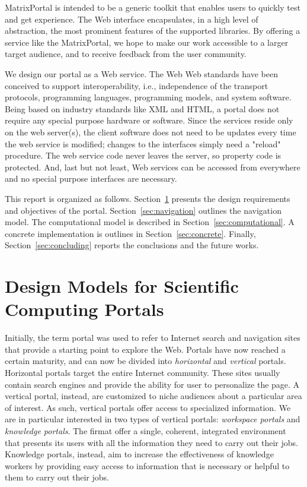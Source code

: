 \documentclass[11pt,relax]{SANDreport}
\begin{document}
MatrixPortal is intended to be a generic
toolkit that enables users to quickly test and get experience. The Web
interface encapsulates, in a high level of abstraction, the most prominent
features of the supported libraries. By offering a service like the
MatrixPortal, we hope to make our work
accessible to a larger target audience, and to receive feedback from the user
community.

We design our portal as a Web service. The Web Web standards have been
conceived to support interoperability, i.e., independence of the transport
protocols, programming languages, programming models, and system software.
Being based on industry standards like XML and HTML, a portal does not require
any special purpose hardware or software.  Since the services reside only on
the web server(s), the client software does not need to be updates every time
the web service is modified; changes to the interfaces simply need a "reload"
procedure.  The web service code never leaves the server, so property code is
protected. And, last but not least, Web services can be accessed from
everywhere and no special purpose interfaces are necessary.

\medskip

This report is organized as follows. Section~\ref{sec:design} presents the
design requirements and objectives of the portal.
Section~\ref{sec:navigation} outlines the navigation model.  The computational
model is described in Section~\ref{sec:computational}. A concrete
implementation is outlines in Section~\ref{sec:concrete}.  Finally,
               Section~\ref{sec:concluding} reports the conclusions and the
               future works.

\section{Design Models for Scientific Computing Portals}
\label{sec:design}

Initially, the term portal was used to refer to Internet search and navigation
sites that provide a starting point to explore the Web. Portals have now
reached a certain maturity, and can now be divided into {\sl horizontal} and
{\sl vertical} portals. Horizontal portals target the entire Internet
community. These sites usually contain search engines and provide the ability
for user to personalize the page. A vertical portal, instead, are customized
to niche audiences about a particular area of interest. As such, vertical
portals offer access to specialized information. We are in particular
interested in two types of vertical portals: {\sl workspace portals} and {\sl
knowledge portals}. The firmat offer a single, coherent, integrated
environment that presents its users with all the information they need to
carry out their jobs. Knowledge portals, instead, aim to increase the
effectiveness of knowledge workers by providing easy access to information
that is necessary or helpful to them to carry out their jobs. 
\end{document}
